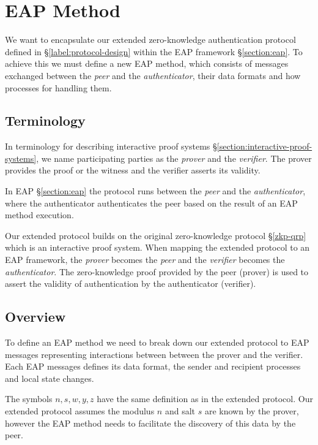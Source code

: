 \section{EAP Method}
We want to encapsulate our extended zero-knowledge authentication protocol defined in \S\ref{label:protocol-design} within the EAP framework \S\ref{section:eap}.
To achieve this we must define a new EAP method, which consists of messages exchanged between the \textit{peer} and the \textit{authenticator}, their data formats and how processes for handling them.

\subsection{Terminology}
In terminology for describing interactive proof systems \S\ref{section:interactive-proof-systems}, we name participating parties as the \textit{prover} and the \textit{verifier}. The prover provides the proof or the witness and the verifier asserts its validity.

In EAP \S\ref{section:eap} the protocol runs between the \textit{peer} and the \textit{authenticator}, where the authenticator authenticates the peer based on the result of an EAP method execution.

Our extended protocol builds on the original zero-knowledge protocol \S\ref{zkp-qrp} which is an interactive proof system. 
When mapping the extended protocol to an EAP framework, the \textit{prover} becomes the \textit{peer} and the \textit{verifier} becomes the \textit{authenticator}.
The zero-knowledge proof provided by the peer (prover) is used to assert the validity of authentication by the authenticator (verifier).

\subsection{Overview}

To define an EAP method we need to break down our extended protocol to EAP messages representing interactions between between the prover and the verifier.
Each EAP messages defines its data format, the sender and recipient processes and local state changes.

The symbols $n, s, w, y, z$ have the same definition as in the extended protocol.
Our extended protocol assumes the modulus $n$ and salt $s$ are known by the prover, however the EAP method needs to facilitate the discovery of this data by the peer.


